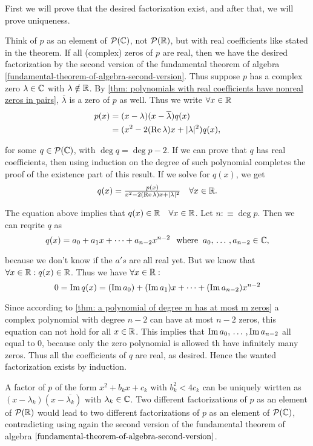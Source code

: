 \begin{prf}
  First we will prove that the desired factorization exist, and after that, we will prove uniqueness.

  Think of $p$ as an element of $\mathcal{P}(\mathbb{C})$, not $\mathcal{P}(\mathbb{R})$, but with real coefficients like stated in the theorem. If all (complex) zeros of $p$ are real, then we have the desired factorization by the second version of the fundamental theorem of algebra \ref{fundamental-theorem-of-algebra-second-version}. Thus suppose $p$ has a complex zero $\lambda \in \mathbb{C}$ with $\lambda \notin \mathbb{R}$. By \ref{thm: polynomials with real coefficients have nonreal zeros in pairs}, $\overline \lambda$ is a zero of $p$ as well. Thus we write $\forall x \in \mathbb{R}$
  \[
  \begin{aligned}
    p(x)
    &= (x - \lambda) (x-\overline \lambda) q(x) \\
    &= (x^2 - 2 (\operatorname{Re}  \lambda)x +  |\lambda|^2) q(x),  \\
  \end{aligned}
  \]

  for some $q \in \mathcal{P}(\mathbb{C})$, with $\deg q = \deg p -2$. If we can prove that $q$ has real coefficients, then using induction on the degree of such polynomial completes the proof of the existence part of this result. If we solve for $q(x)$, we get
  \[
    q(x) = \tfrac{p(x)}{x^2 - 2(\operatorname{Re} \lambda) x  + |\lambda|^2} \quad \forall x \in \mathbb{R}.
  \]

  The equation above implies that $q(x) \in \mathbb{R} \quad \forall x \in \mathbb{R}$. Let $n :\equiv \deg p$. Then we can reqrite $q$ as
  \[
    q(x) = a_0 + a_1 x + \cdots + a_{n-2} x^{n-2} \;\;\, \text{where}\;\; a_0, {\, \ldots \,\,}, a_{n-2} \in \mathbb{C},
  \]

  because we don't know if the $a's$ are all real yet. But we know that $\forall x \in \mathbb{R}: q(x) \in \mathbb{R}$. Thus we have $\forall x \in \mathbb{R}:$
  \[
    0 = \operatorname{Im} q(x) = (\operatorname{Im} a_0) + (\operatorname{Im} a_1)x + \cdots + (\operatorname{Im} a_{n-2})x^{n-2}
  \]

  Since according to \ref{thm: a polynomial of degree m has at most m zeros} a complex polynomial with degree $n-2$ can have at most $n-2$ zeros, this equation can not hold for all $x \in \mathbb{R}$. This implies that $\operatorname{Im} a_0, {\, \ldots \,\,}, \operatorname{Im} a_{n-2}$ all equal to $0$, because only the zero polynomial is allowed th have infinitely many zeros. Thus all the coefficients of $q$ are real, as desired. Hence the wanted factorization exists by induction.

   A factor of $p$ of the form $x^2 + b_kx + c_k$ with $b_k^2 < 4c_k$ can be uniquely wirtten as $(x-\lambda_k)(x-\overline{\lambda_k})$ with $\lambda_k \in \mathbb{C}$. Two different factorizations of $p$ as an element of $\mathcal{P}(\mathbb{R})$ would lead to two different factorizations of $p$ as an element of $\mathcal{P}(\mathbb{C})$, contradicting using again the second version of the fundamental theorem of algebra $\ref{fundamental-theorem-of-algebra-second-version}$.
\end{prf}
